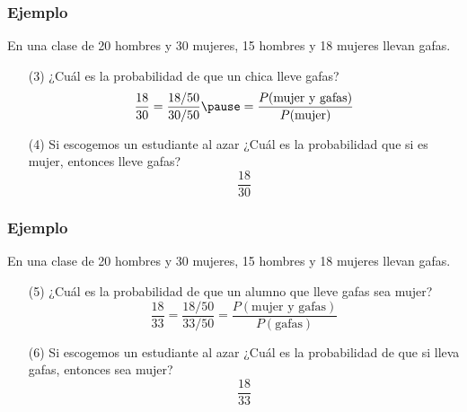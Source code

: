 \documentclass[handout]{beamer}\usepackage[]{graphicx}\usepackage[]{color}
\theoremstyle{plain}
\theoremstyle{definition}
\begin{document}
\begin{frame}
\frametitle{Ejemplo}

En una clase de 20 hombres  y 30 mujeres, 15 hombres y 18 mujeres llevan gafas.
\medskip


\begin{enumerate} 

\item[(3)]  ¿Cuál es la probabilidad de que un chica lleve gafas?
\pause
$$
\frac{18}{30}=\frac{18/50}{30/50}\pause=\frac{P(\mbox{mujer  y gafas})}{P(\mbox{mujer})}
$$
\pause

\item[(4)] Si escogemos un estudiante al azar ¿Cuál es la probabilidad que si es mujer, entonces lleve gafas?
\pause
$$
\frac{18}{30}
$$
\end{enumerate}

\end{frame}




\begin{frame}
\frametitle{Ejemplo}

En una clase de 20 hombres  y 30 mujeres, 15 hombres y 18 mujeres llevan gafas.
\medskip


\begin{enumerate} 
\item[(5)]  ¿Cuál es la probabilidad de que un alumno que lleve gafas sea mujer?
\pause
$$
\frac{18}{33}=\frac{18/50}{33/50}=\frac{P(\mbox{mujer y gafas})}{P(\mbox{gafas})}
$$
\pause

\item[(6)] Si escogemos un estudiante al azar  ¿Cuál es la probabilidad de que si lleva gafas, entonces sea mujer?
$$
\frac{18}{33}
$$
\end{enumerate}

\end{frame}
\end{document}
